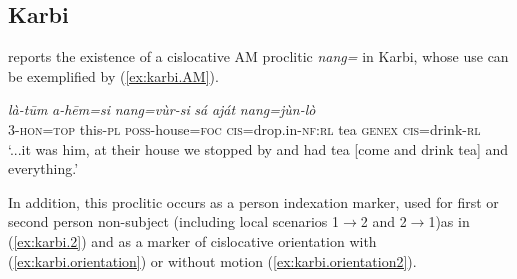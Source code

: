 \documentclass[oneside,a4paper,11pt]{article}
\newcommand{\ipa}[1]{{\phon\textit{#1}}}
\newcommand{\zh}[1]{{\cn #1}}
\newcommand{\rouge}[1]{{\color{red}#1}}
\newcommand{\gray}[1]{\cellcolor{lightgray!30}{#1}}
\begin{document}
% 

 
 


\subsection{Karbi}
\citet{konnerth14karbi, konnerth15cisloc} reports the existence of a cislocative AM proclitic \ipa{nang=} in Karbi, whose use can be exemplified by (\ref{ex:karbi.AM}).

\begin{exe}
\ex \label{ex:karbi.AM}
\gll \ipa{alàng-lì=ke}	\ipa{là-tūm}	\ipa{a-hēm=si}	\ipa{\rouge{nang}=vùr-si}	\ipa{sá}	\ipa{aját}	\ipa{\rouge{nang}=jùn-lò} \\
 3-\textsc{hon}=\textsc{top} this-\textsc{pl} \textsc{poss}-house=\textsc{foc} \rouge{\textsc{cis}}=drop.in-\textsc{nf}:\textsc{rl} tea \textsc{genex} \rouge{\textsc{cis}}=drink-\textsc{rl} \\
 \glt `...it was him, at their house we stopped by and had tea [{come} and drink tea] and everything.'
\end{exe}

In addition, this proclitic occurs as a person indexation marker, used for first or second person non-subject (including local scenarios 1$\rightarrow$2  and 2$\rightarrow$1)as in (\ref{ex:karbi.2}) and as a marker of cislocative orientation with (\ref{ex:karbi.orientation}) or without motion (\ref{ex:karbi.orientation2}).
\end{document}
